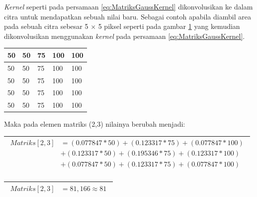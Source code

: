 \noindent\textit{Kernel} seperti pada persamaan \ref{eq:MatriksGaussKernel} dikonvolusikan ke dalam citra untuk mendapatkan sebuah nilai baru. Sebagai contoh apabila diambil area pada sebuah citra sebesar 5 $\times$ 5 piksel seperti pada gambar \ref{fig:MatriksCitra} yang kemudian dikonvolusikan menggunakan \textit{kernel} pada persamaan \ref{eq:MatriksGaussKernel}.

\begin{table}[H]
	\centering
	\begin{small}
		\begin{tabular}{|p{1cm}|p{1cm}|p{1cm}|p{1cm}|p{1cm}|}
			\hline
			50 & 50 & 75 & 100 & 100 \\
			\hline
			50 & 50 & 75 & 100 & 100 \\
			\hline
			50 & 50 & 75 & 100 & 100 \\
			\hline
			50 & 50 & 75 & 100 & 100 \\
			\hline
			50 & 50 & 75 & 100 & 100 \\\hline
		\end{tabular}
	\end{small}
	\label{fig:MatriksCitra}
\end{table}

\noindent Maka pada elemen matriks (2,3) nilainya berubah menjadi:
\begin{table}[H]
	\begin{adjustbox}{width=1\textwidth}
		\begin{tabular}{|p{13.55cm}|}
			\hline
			\begin{equation}\nonumber
			\begin{aligned}
			Matriks[2,3] &= (0.077847 * 50) + (0.123317 * 75) + (0.077847 * 100) \\
						 &+ (0.123317 * 50) + (0.195346 * 75) + (0.123317 * 100) \\
						 &+ (0.077847 * 50) + (0.123317 * 75) + (0.077847 * 100)\\
			\end{aligned}
			\end{equation}\\
			\hline
		\end{tabular}
	\end{adjustbox}
\end{table}

\begin{table}[H]
	\begin{adjustbox}{width=1\textwidth}
		\begin{tabular}{|p{13.55cm}|}
			\hline
			\begin{equation}\nonumber
			\begin{aligned}
			Matriks[2,3] &= 81,166 \approx 81
			\end{aligned}
			\end{equation}\\
			\hline
		\end{tabular}
	\end{adjustbox}
\end{table}

